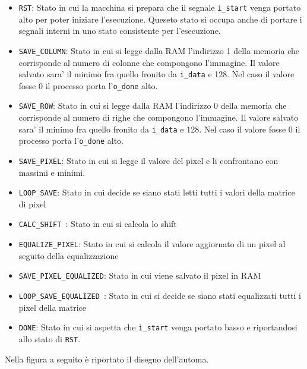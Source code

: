 \documentclass{article}
\begin{document}
\begin{itemize}
\item \texttt{RST}: Stato in cui la macchina si prepara che il segnale \texttt{i\_start} venga portato alto per poter iniziare l'esecuzione. Queseto stato si occupa anche di portare i segnali interni in uno stato consistente per l'esecuzione.
\item \texttt{SAVE\_COLUMN}: Stato in cui si legge dalla RAM l'indirizzo 1 della memoria che corrisponde al numero di colonne che compongono l'immagine. Il valore salvato sara' il minimo fra quello fronito da \texttt{i\_data} e 128. Nel caso il valore fosse 0 il processo porta l'\texttt{o\_done} alto.
\item \texttt{SAVE\_ROW}: Stato in cui si legge dalla RAM l'indirizzo 0 della memoria che corrisponde al numero di righe che compongono l'immagine. Il valore salvato sara' il minimo fra quello fronito da \texttt{i\_data} e 128. Nel caso il valore fosse 0 il processo porta l'\texttt{o\_done} alto.
\item \texttt{SAVE\_PIXEL}: Stato in cui si legge il valore del pixel e li confrontano con massimi e minimi.
\item \texttt{LOOP\_SAVE}: Stato in cui decide se siano stati letti tutti i valori della matrice di pixel
\item \texttt{CALC\_SHIFT }: Stato in cui si calcola lo shift
\item \texttt{EQUALIZE\_PIXEL}: Stato in cui si calcola il valore aggiornato di un pixel al seguito della equalizzazione
\item \texttt{SAVE\_PIXEL\_EQUALIZED}: Stato in cui viene salvato il pixel in RAM
\item \texttt{LOOP\_SAVE\_EQUALIZED }: Stato in cui si decide se siano stati equalizzati tutti i pixel della matrice
\item \texttt{DONE}: Stato in cui si aspetta che \texttt{i\_start} venga portato basso e riportandosi allo stato di \texttt{RST}.
\end{itemize}

Nella figura a seguito è riportato il disegno dell'automa.
\end{document}
